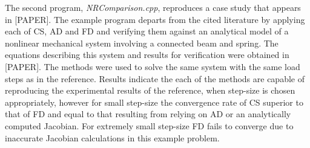 The second program, \emph{NRComparison.cpp}, reproduces a case study that
appears in [PAPER]. The example program departs from the cited literature by
applying each of CS, AD and FD and verifying them against an analytical model
of a nonlinear mechanical system involving a connected beam and spring. The
equations describing this system and results for verification were obtained in
[PAPER]. The methods were used to solve the same system with the same load
steps as in the reference. Results indicate the each of the methods are capable
of reproducing the experimental results of the reference, when step-size is
chosen appropriately, however for small step-size the convergence rate of CS
superior to that of FD and equal to that resulting from relying on AD or an
analytically computed Jacobian. For extremely small step-size FD fails to
converge due to inaccurate Jacobian calculations in this example problem.
